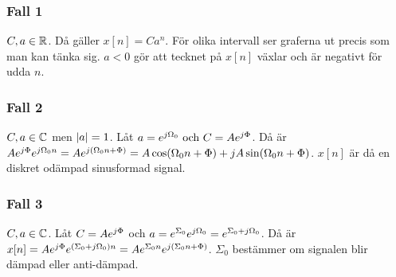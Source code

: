 \documentclass[a4paper]{article}
\begin{document}
\subsubsection{Fall 1}
\(
    C, a \in \mathbb{R}
\). Då gäller \(
    x[n] = C a^n
\). För olika intervall ser graferna ut precis som man kan tänka sig.
\(
    a < 0
\) gör att tecknet på \(
    x[n]
\) växlar och är negativt för udda \(
    n
\). 

\subsubsection{Fall 2}
\(
    C, a \in \mathbb{C}
\) men \(
    \abs{a} = 1
\). Låt \(
    a = e^{j\Omega_0} \text{ och } C = Ae^{j\Phi}
\). Då är \(
    A e^{j\Phi}e^{j\Omega_0n} = A e^{j(\Omega_0n+\Phi)} 
    = A \cos(\Omega_0n+\Phi) + j A\sin(\Omega_0n+\Phi)
\). \(
    x[n]
\) är då en diskret odämpad sinusformad signal. 

\subsubsection{Fall 3}
\(
    C, a \in \mathbb{C}
\). Låt \(
    C = Ae^{j \Phi}
\) och \(
    a = e^{\Sigma_0} e^{j\Omega_0} = e^{\Sigma_0+j\Omega_0}
\). Då är \(
    x[n] = Ae^{j\Phi}e^{(\Sigma_0+j\Omega_0)n} 
    = A e^{\Sigma_0n} e^{j(\Sigma_0n+\Phi)}
\). \(
    \Sigma_0 
\) bestämmer om signalen blir dämpad eller anti-dämpad.
\end{document}
